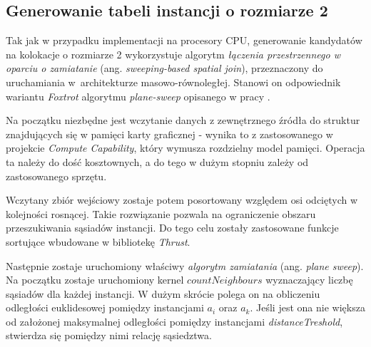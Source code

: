 \documentclass[12pt]{article}
\begin{document}


\subsection{Generowanie tabeli instancji o rozmiarze 2}

Tak jak w przypadku implementacji na procesory CPU, generowanie kandydatów na kolokacje o rozmiarze 2 wykorzystuje algorytm \textit{łączenia przestrzennego w oparciu o zamiatanie} (ang. \textit{sweeping-based spatial join}), przeznaczony do uruchamiania w~architekturze masowo-równoległej. Stanowi on odpowiednik wariantu \textit{Foxtrot} algorytmu \textit{plane-sweep} opisanego w pracy \cite{plane2}. 

Na początku niezbędne jest wczytanie danych z zewnętrznego źródła do struktur znajdujących się w pamięci karty graficznej - wynika to z zastosowanego w projekcie \textit{Compute Capability}, który wymusza rozdzielny model pamięci. Operacja ta należy do dość kosztownych, a do tego w dużym stopniu zależy od zastosowanego sprzętu.

Wczytany zbiór wejściowy zostaje potem posortowany względem osi odciętych w kolejności rosnącej. Takie rozwiązanie pozwala na ograniczenie obszaru przeszukiwania sąsiadów instancji. Do tego celu zostały zastosowane funkcje sortujące wbudowane w bibliotekę \textit{Thrust}.

Następnie zostaje uruchomiony właściwy \textit{algorytm zamiatania} (ang. \textit{plane sweep}). Na początku zostaje uruchomiony kernel $ countNeighbours $ wyznaczający liczbę sąsiadów dla każdej instancji. W dużym skrócie polega on na obliczeniu odległości euklidesowej pomiędzy instancjami $ a_{i} $ oraz $ a_{k} $. Jeśli jest ona nie większa od założonej maksymalnej odległości pomiędzy instancjami \textit{distanceTreshold}, stwierdza się pomiędzy nimi relację sąsiedztwa. 
\end{document}
